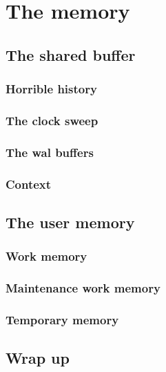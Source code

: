 \chapter{The memory}
\label{ch:PGMEMORY}

\section{The shared buffer}
\subsection{Horrible history}
\subsection{The clock sweep}
\subsection{The wal buffers}
\subsection{Context}

\section{The user memory}
\subsection{Work memory}
\subsection{Maintenance work memory}
\subsection{Temporary memory}

\section{Wrap up}